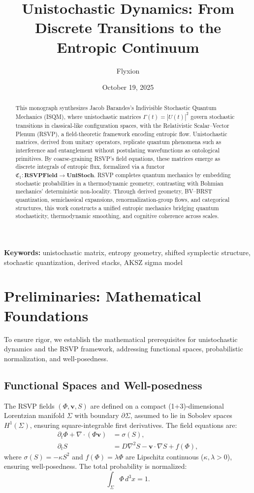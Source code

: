 \documentclass[12pt]{article}
\title{\textbf{Unistochastic Dynamics: From Discrete Transitions to the Entropic Continuum}}
\author{Flyxion}
\date{October 19, 2025}
\begin{document}
\maketitle

\begin{abstract}
This monograph synthesizes Jacob Barandes’s Indivisible Stochastic Quantum Mechanics (ISQM), where unistochastic matrices \(\Gamma(t) = |U(t)|^2\) govern stochastic transitions in classical-like configuration spaces, with the Relativistic Scalar–Vector Plenum (RSVP), a field-theoretic framework encoding entropic flow. Unistochastic matrices, derived from unitary operators, replicate quantum phenomena such as interference and entanglement without postulating wavefunctions as ontological primitives. By coarse-graining RSVP’s field equations, these matrices emerge as discrete integrals of entropic flux, formalized via a functor \(\mathfrak{C}_1: \mathbf{RSVPField} \to \mathbf{UniStoch}\). RSVP completes quantum mechanics by embedding stochastic probabilities in a thermodynamic geometry, contrasting with Bohmian mechanics’ deterministic non-locality. Through derived geometry, BV–BRST quantization, semiclassical expansions, renormalization-group flows, and categorical structures, this work constructs a unified entropic mechanics bridging quantum stochasticity, thermodynamic smoothing, and cognitive coherence across scales.
\end{abstract}

\noindent\textbf{Keywords:} unistochastic matrix, entropy geometry, shifted symplectic structure, stochastic quantization, derived stacks, AKSZ sigma model

\newpage
\tableofcontents
\newpage

\section{Preliminaries: Mathematical Foundations}

To ensure rigor, we establish the mathematical prerequisites for unistochastic dynamics and the RSVP framework, addressing functional spaces, probabilistic normalization, and well-posedness.

\subsection{Functional Spaces and Well-posedness}

The RSVP fields \((\Phi, \mathbf{v}, S)\) are defined on a compact (1+3)-dimensional Lorentzian manifold \(\Sigma\) with boundary \(\partial \Sigma\), assumed to lie in Sobolev spaces \(H^1(\Sigma)\), ensuring square-integrable first derivatives. The field equations are:
\begin{align}
\partial_t \Phi + \nabla \cdot (\Phi \mathbf{v}) &= \sigma(S), \label{eq:PDE1} \\
\partial_t S &= D \nabla^2 S - \mathbf{v} \cdot \nabla S + f(\Phi), \label{eq:PDE2}
\end{align}
where \(\sigma(S) = -\kappa S^2\) and \(f(\Phi) = \lambda \Phi\) are Lipschitz continuous (\(\kappa, \lambda > 0\)), ensuring well-posedness. The total probability is normalized:
\[
\int_\Sigma \Phi \, d^3x = 1.
\]
\end{document}
